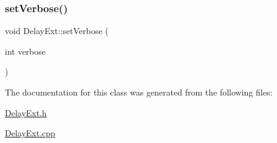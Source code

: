 \subsubsection{\texorpdfstring{set\+Verbose()}{setVerbose()}}
{\footnotesize\ttfamily void Delay\+Ext\+::set\+Verbose (\begin{DoxyParamCaption}\item[{int}]{verbose }\end{DoxyParamCaption})}



The documentation for this class was generated from the following files\+:\begin{DoxyCompactItemize}
\item 
\mbox{\hyperlink{_delay_ext_8h}{Delay\+Ext.\+h}}\item 
\mbox{\hyperlink{_delay_ext_8cpp}{Delay\+Ext.\+cpp}}\end{DoxyCompactItemize}
